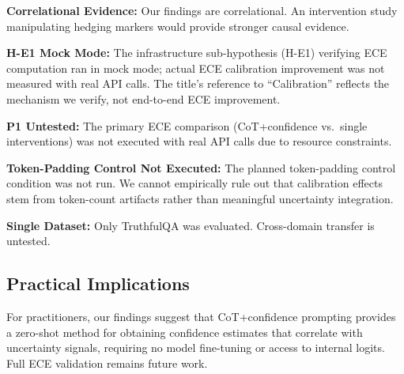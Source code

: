\textbf{Correlational Evidence:} Our findings are correlational. An intervention study manipulating hedging markers would provide stronger causal evidence.

\textbf{H-E1 Mock Mode:} The infrastructure sub-hypothesis (H-E1) verifying ECE computation ran in mock mode; actual ECE calibration improvement was not measured with real API calls. The title's reference to ``Calibration'' reflects the mechanism we verify, not end-to-end ECE improvement.

\textbf{P1 Untested:} The primary ECE comparison (CoT+confidence vs.\ single interventions) was not executed with real API calls due to resource constraints.

\textbf{Token-Padding Control Not Executed:} The planned token-padding control condition was not run. We cannot empirically rule out that calibration effects stem from token-count artifacts rather than meaningful uncertainty integration.

\textbf{Single Dataset:} Only TruthfulQA was evaluated. Cross-domain transfer is untested.

\subsection{Practical Implications}

For practitioners, our findings suggest that CoT+confidence prompting provides a zero-shot method for obtaining confidence estimates that correlate with uncertainty signals, requiring no model fine-tuning or access to internal logits. Full ECE validation remains future work.
